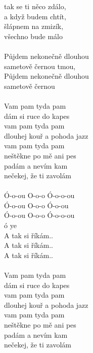 \begin{multicols}{2}
tak se ti něco zdálo,\\
a když budem chtít,\\
šlápnem na zmizík,\\
všechno bude málo\\
\columnbreak
\\
Půjdem nekonečně dlouhou\\
sametově černou tmou,\\
Půjdem nekonečně dlouhou\\
sametově černou\\
\\
Vam pam tyda pam\\
dám si ruce do kapes\\
vam pam tyda pam\\
dlouhej kouř a pohoda jazz\\
vam pam tyda pam\\
neštěkne po mě ani pes\\
padám a nevím kam\\
nečekej, že ti zavolám\\
\\
Ó-o-ou O-o-o Ó-o-o-ou\\
Ó-o-ou O-o-o Ó-o-ou\\
Ó-o-ou O-o-o Ó-o-o-ou\\
ó ye\\
A tak si říkám..\\
A tak si říkám..\\
A tak si říkám..\\
\\
Vam pam tyda pam\\
dám si ruce do kapes\\
vam pam tyda pam\\
dlouhej kouř a pohoda jazz\\
vam pam tyda pam\\
neštěkne po mě ani pes\\
padám a nevím kam\\
nečekej, že ti zavolám\\
\end{multicols}